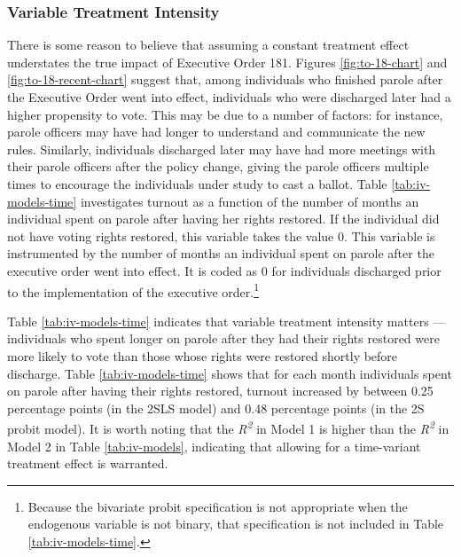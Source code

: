 \documentclass[12pt,]{article}
\let\rmarkdownfootnote\footnote%
\def\footnote{\protect\rmarkdownfootnote}
\begin{document}
\hypertarget{variable-treatment-intensity}{%
\subsubsection*{Variable Treatment Intensity}\label{variable-treatment-intensity}}

There is some reason to believe that assuming a constant treatment effect understates the true impact of Executive Order 181. Figures \ref{fig:to-18-chart} and \ref{fig:to-18-recent-chart} suggest that, among individuals who finished parole after the Executive Order went into effect, individuals who were discharged later had a higher propensity to vote. This may be due to a number of factors: for instance, parole officers may have had longer to understand and communicate the new rules. Similarly, individuals discharged later may have had more meetings with their parole officers after the policy change, giving the parole officers multiple times to encourage the individuals under study to cast a ballot. Table \ref{tab:iv-models-time} investigates turnout as a function of the number of months an individual spent on parole after having her rights restored. If the individual did not have voting rights restored, this variable takes the value 0. This variable is instrumented by the number of months an individual spent on parole after the executive order went into effect. It is coded as 0 for individuals discharged prior to the implementation of the executive order.\footnote{Because the bivariate probit specification is not appropriate when the endogenous variable is not binary, that specification is not included in Table \ref{tab:iv-models-time}.}



Table \ref{tab:iv-models-time} indicates that variable treatment intensity matters --- individuals who spent longer on parole after they had their rights restored were more likely to vote than those whose rights were restored shortly before discharge. Table \ref{tab:iv-models-time} shows that for each month individuals spent on parole after having their rights restored, turnout increased by between 0.25 percentage points (in the 2SLS model) and 0.48 percentage points (in the 2S probit model). It is worth noting that the \emph{R\textsuperscript{2}} in Model 1 is higher than the \emph{R\textsuperscript{2}} in Model 2 in Table \ref{tab:iv-models}, indicating that allowing for a time-variant treatment effect is warranted.
\end{document}
